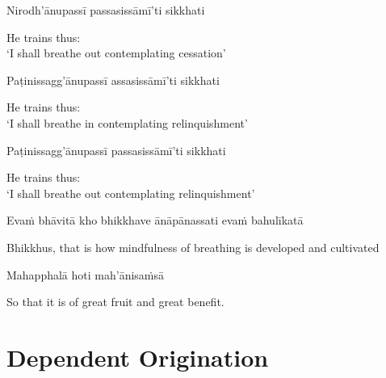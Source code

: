 Nirodh'ānupassī passasissāmī'ti sikkhati

\begin{english}
  He trains thus:\\
  `I shall breathe out contemplating cessation'
\end{english}

Paṭinissagg'ānupassī assasissāmī'ti sikkhati

\begin{english}
  He trains thus:\\
  `I shall breathe in contemplating relinquishment'
\end{english}

Paṭinissagg'ānupassī passasissāmī'ti sikkhati

\begin{english}
  He trains thus:\\
  `I shall breathe out contemplating relinquishment'
\end{english}

Evaṁ bhāvitā kho bhikkhave ānāpānassati evaṁ bahulīkatā

\begin{english-hang}
  Bhikkhus, that is how mindfulness of breathing is developed and cultivated
\end{english-hang}

Mahapphalā hoti mah'ānisaṁsā

\begin{english}
  So that it is of great fruit and great benefit.
\end{english}

\suttaRef{[MN 118]}


\section{Dependent Origination}
\label{dependent-origination}

